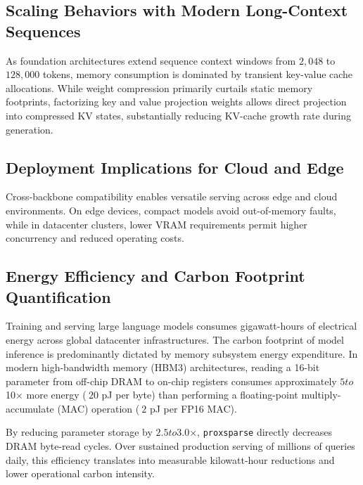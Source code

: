 \subsection{Scaling Behaviors with Modern Long-Context Sequences}
As foundation architectures extend sequence context windows from $2{,}048$ to $128{,}000$ tokens, memory consumption is dominated by transient key-value cache allocations. While weight compression primarily curtails static memory footprints, factorizing key and value projection weights allows direct projection into compressed KV states, substantially reducing KV-cache growth rate during generation.

\subsection{Deployment Implications for Cloud and Edge}
Cross-backbone compatibility enables versatile serving across edge and cloud environments. On edge devices, compact models avoid out-of-memory faults, while in datacenter clusters, lower VRAM requirements permit higher concurrency and reduced operating costs.

\subsection{Energy Efficiency and Carbon Footprint Quantification}
Training and serving large language models consumes gigawatt-hours of electrical energy across global datacenter infrastructures. The carbon footprint of model inference is predominantly dictated by memory subsystem energy expenditure. In modern high-bandwidth memory (HBM3) architectures, reading a 16-bit parameter from off-chip DRAM to on-chip registers consumes approximately $5$\times$ to $10$\times$ more energy ($~20$ pJ per byte) than performing a floating-point multiply-accumulate (MAC) operation ($~2$ pJ per FP16 MAC).

By reducing parameter storage by $2.5$\times$ to $3.0$\times$, \texttt{proxsparse} directly decreases DRAM byte-read cycles. Over sustained production serving of millions of queries daily, this efficiency translates into measurable kilowatt-hour reductions and lower operational carbon intensity.
